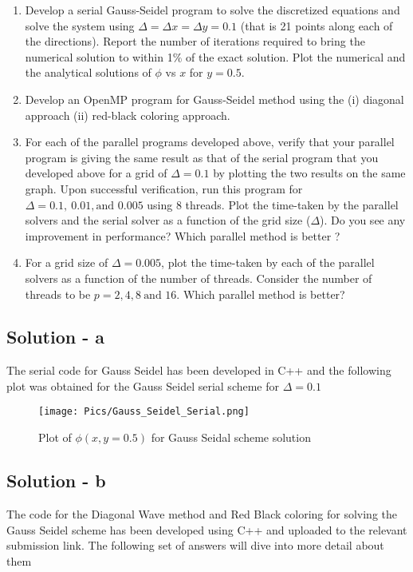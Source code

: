 \documentclass[12pt]{article}
\begin{document}
\begin{enumerate}[label=\alph*]
    \item Develop a serial Gauss-Seidel program to solve the discretized equations and solve the system using $\Delta = \Delta x = \Delta y = 0.1$ (that is 21 points along each of the directions). Report the number of iterations required to bring the numerical solution to within 1$\%$ of the exact solution. Plot the numerical and the analytical solutions of $\phi$ vs $x$ for $y = 0.5$.
    \item Develop an OpenMP program for Gauss-Seidel method using the (i) diagonal approach (ii) red-black coloring approach.
    \item For each of the parallel programs developed above, verify that your parallel program is giving the same result as that of the serial program that you developed above for a grid of $\Delta = 0.1$ by plotting the two results on the same graph. Upon successful verification, run this program for $\Delta = 0.1, \ 0.01, \text{and \ } 0.005$ using 8 threads.  Plot the time-taken by the parallel solvers and the serial solver as a function of the grid size ($\Delta$). Do you see any improvement in performance? Which parallel method is better ?
    \item For a grid size of $\Delta = 0.005$, plot the time-taken by each of the parallel solvers as a function of the number of threads. Consider the number of threads to be $p = 2, 4, 8\ \text{and \ } 16$. Which parallel method is better?
\end{enumerate}

\subsection*{Solution - a}

\noindent The serial code for Gauss Seidel has been developed in C++ and the following plot was obtained for the Gauss Seidel serial scheme for $\Delta = 0.1$ 
\begin{figure}[!ht]
    \centering
    \texttt{[image: Pics/Gauss\_Seidel\_Serial.png]}
    \caption{Plot of $\phi(x,y=0.5)$ for Gauss Seidal scheme solution}
    \label{fig:GS}
\end{figure}
\vspace{-2mm}
\subsection*{Solution - b}
\noindent The code for the Diagonal Wave method and Red Black coloring for solving the Gauss Seidel scheme has been developed using C++ and uploaded to the relevant submission link. The following set of answers will dive into more detail about them
\end{document}

